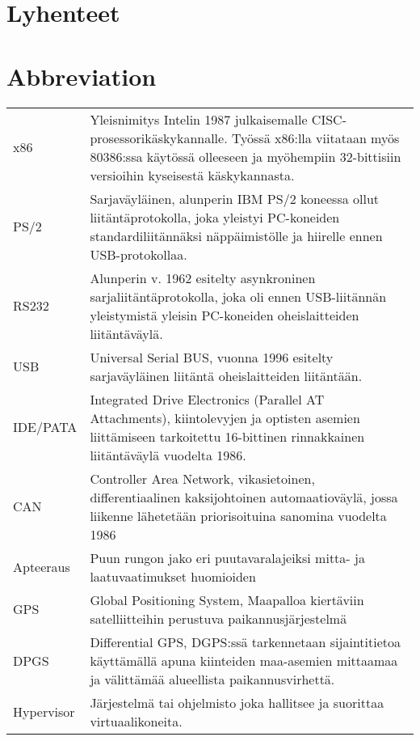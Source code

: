 \pagestyle{empty}
\setlength{\parskip}{1cm}
 {
  \chapter*{Lyhenteet}
} {
  \chapter*{Abbreviation}
}
\begin{table}[h]
\setlength{\tabcolsep}{8pt}
\renewcommand{\arraystretch}{2}
\begin{tabular}{l p{12cm}}
x86 & Yleisnimitys Intelin 1987 julkaisemalle CISC-prosessorikäskykannalle. Työssä x86:lla viitataan myös 80386:ssa käytössä olleeseen ja myöhempiin 32-bittisiin versioihin kyseisestä käskykannasta.\\
PS/2 & Sarjaväyläinen, alunperin IBM PS/2 koneessa ollut liitäntäprotokolla, joka yleistyi PC-koneiden standardiliitännäksi näppäimistölle ja hiirelle ennen USB-protokollaa.\\
RS232 & Alunperin v. 1962 esitelty asynkroninen sarjaliitäntäprotokolla, joka oli ennen USB-liitännän yleistymistä yleisin PC-koneiden oheislaitteiden liitäntäväylä.\\
USB & Universal Serial BUS, vuonna 1996 esitelty sarjaväyläinen liitäntä oheislaitteiden liitäntään.\\
IDE/PATA & Integrated Drive Electronics (Parallel AT Attachments), kiintolevyjen ja optisten asemien liittämiseen tarkoitettu 16-bittinen rinnakkainen liitäntäväylä vuodelta 1986.\\
CAN & Controller Area Network, vikasietoinen, differentiaalinen kaksijohtoinen automaatioväylä, jossa liikenne lähetetään priorisoituina sanomina vuodelta 1986\\
Apteeraus & Puun rungon jako eri puutavaralajeiksi mitta- ja laatuvaatimukset huomioiden\\
GPS & Global Positioning System, Maapalloa kiertäviin satelliitteihin perustuva paikannusjärjestelmä\\
DPGS & Differential GPS, DGPS:ssä tarkennetaan sijaintitietoa käyttämällä apuna kiinteiden maa-asemien mittaamaa ja välittämää alueellista paikannusvirhettä.\\
Hypervisor & Järjestelmä tai ohjelmisto joka hallitsee ja suorittaa virtuaalikoneita.\\
%
\end{tabular}
\end{table}


